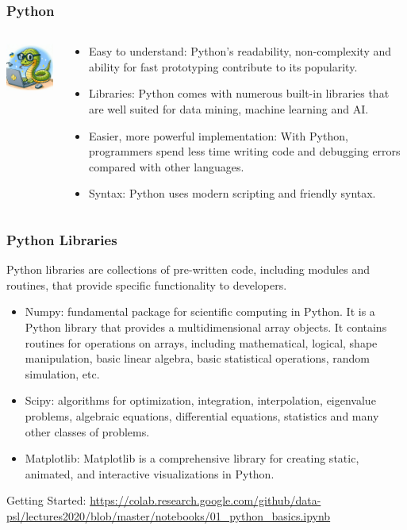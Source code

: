 \documentclass{beamer}
\begin{document}
\begin{frame}\frametitle{Python}
\begin{columns}
\begin{column}{3.5cm}
\begin{center}
\includegraphics[width=3.5cm]{fig/python1.png}
\end{center}
\end{column}
\begin{column}{7.5cm}
\begin{itemize}
\item Easy to understand: Python’s readability, non-complexity and ability for fast prototyping contribute to its popularity. 
\item Libraries: Python comes with numerous built-in libraries that are well suited for data mining, machine learning and AI.
\item Easier, more powerful implementation: With Python, programmers spend less time writing code and debugging errors compared with other languages.
\item Syntax: Python uses modern scripting and friendly syntax.
\end{itemize}
\end{column}
\end{columns}


\end{frame}

\begin{frame}\frametitle{Python Libraries}
Python libraries are collections of pre-written code, including modules and routines, that provide specific functionality to developers. 
\begin{itemize}
\item Numpy: fundamental package for scientific computing in Python. It is a Python library that provides a multidimensional array objects. It contains routines for operations on arrays, including mathematical, logical, shape manipulation,  basic linear algebra, basic statistical operations, random simulation, etc.
\item Scipy: algorithms for optimization, integration, interpolation, eigenvalue problems, algebraic equations, differential equations, statistics and many other classes of problems.
\item Matplotlib: Matplotlib is a comprehensive library for creating static, animated, and interactive visualizations in Python.
\end{itemize}

Getting Started: 
\url{https://colab.research.google.com/github/data-psl/lectures2020/blob/master/notebooks/01_python_basics.ipynb}
\end{frame}
\end{document}
